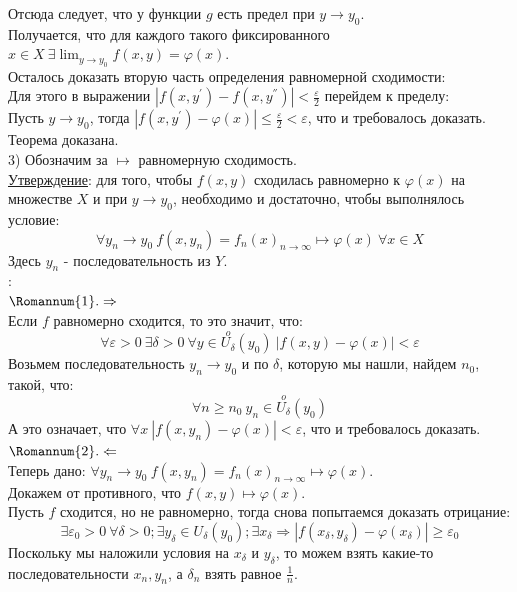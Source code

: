 \documentclass[12pt]{article}
\begin{document}
Отсюда следует, что у функции $g$ есть предел при $y \to y_0$.\\
Получается, что для каждого такого фиксированного $x \in X \ \exists \lim_{y \to y_0} f(x,y) = \varphi(x)$.\\
Осталось доказать вторую часть определения равномерной сходимости:\\
Для этого в выражении $|f(x,y^{'})-f(x,y^{''})| < \frac{\varepsilon}{2}$ перейдем к пределу:\\
Пусть $y \to y_0$, тогда $|f(x,y^{'})-\varphi(x)| \leq \frac{\varepsilon}{2} < \varepsilon$, что и требовалось доказать.\\
Теорема доказана.\\
3) Обозначим за $\mapsto$ равномерную сходимость.\\
\uline{Утверждение}: для того, чтобы $f(x,y)$ сходилась равномерно к $\varphi(x)$ на множестве $X$ и при $y \to y_0$, необходимо и достаточно, чтобы выполнялось условие:\\
$$\forall y_n \to y_0 \ f(x,y_n) = f_n(x)_{n \to \infty} \mapsto \varphi(x) \ \forall x \in X$$
Здесь $y_n$ - последовательность из $Y$.\\
:\\
$\Romannum{1}. \Rightarrow$\\
Если $f$ равномерно сходится, то это значит, что:\\
$$\forall \varepsilon > 0 \ \exists \delta > 0 \ \forall y \in \overset{o}{U_\delta}(y_0) \ |f(x,y)-\varphi(x)| < \varepsilon$$
Возьмем последовательность $y_n \to y_0$ и по $\delta$, которую мы нашли, найдем $n_0$, такой, что:\\
$$\forall n \geq n_0 \ y_n \in \overset{o}{U_\delta}(y_0)$$
А это означает, что $\forall x \ |f(x,y_n)-\varphi(x)| < \varepsilon$, что и требовалось доказать.\\
$\Romannum{2}. \Leftarrow$\\
Теперь дано: $\forall y_n \to y_0 \ f(x,y_n) = f_n(x)_{n \to \infty} \mapsto \varphi(x)$.\\
Докажем от противного, что $f(x,y) \mapsto \varphi(x)$.\\
Пусть $f$ сходится, но не равномерно, тогда снова попытаемся доказать отрицание:\\
$$\exists \varepsilon_0 > 0 \ \forall \delta > 0; \exists y_{\delta} \in U_{\delta} (y_0); \exists x_{\delta} \Rightarrow |f(x_{\delta}, y_{\delta})-\varphi(x_{\delta})| \geq \varepsilon_0$$
Поскольку мы наложили условия на $x_\delta$ и $y_\delta$, то можем взять какие-то последовательности $x_n, y_n$, а $\delta_n$ взять равное $\frac{1}{n}$.\\
\end{document}
